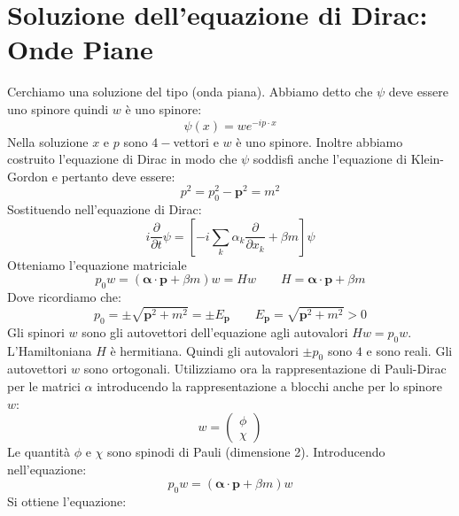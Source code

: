 \section{Soluzione dell'equazione di Dirac: Onde Piane}
Cerchiamo una soluzione del tipo (onda piana). Abbiamo detto che $\psi$ deve essere uno spinore quindi $w$ è uno spinore:
\begin{equation*}
    \psi(x)=we^{-ip\cdot x}
\end{equation*}
Nella soluzione $x$ e $p$ sono $4-$vettori e $w$ è uno spinore. Inoltre abbiamo costruito l'equazione di Dirac in modo che $\psi$ soddisfi anche l'equazione di Klein-Gordon e pertanto deve essere:
\begin{equation*}
    p^2=p^2_0-\mathbf{p}^2=m^2
\end{equation*}
Sostituendo nell'equazione di Dirac:
\begin{equation*}
    i \frac{\partial}{\partial t} \psi=\left[-i \sum_k \alpha_k \frac{\partial}{\partial x_k}+\beta m\right] \psi
\end{equation*}
Otteniamo l'equazione matriciale 
\begin{equation*}
    p_0w=\left(\boldsymbol{\alpha}\cdot\mathbf{p}+\beta m\right)w=Hw \qquad H=\boldsymbol{\alpha}\cdot\mathbf{p}+\beta m
\end{equation*}
Dove ricordiamo che:
\begin{equation*}
    p_0=\pm\sqrt{\mathbf{p}^2+m^2}=\pm E_\mathbf{p} \qquad E_\mathbf{p}=\sqrt{\mathbf{p}^2+m^2}>0
\end{equation*}
Gli spinori $w$ sono gli autovettori dell'equazione agli autovalori $Hw=p_0w$. L'Hamiltoniana $H$ è hermitiana. Quindi gli autovalori $\pm p_0$ sono $4$ e sono reali. Gli autovettori $w$ sono ortogonali. Utilizziamo ora la rappresentazione di Pauli-Dirac per le matrici $\alpha$ introducendo la rappresentazione a blocchi anche per lo spinore $w$:
\begin{equation*}
    w=\begin{pmatrix}
        \phi \\ \chi
    \end{pmatrix}
\end{equation*}
Le quantità $\phi$ e $\chi$ sono spinodi di Pauli (dimensione 2). Introducendo nell'equazione:
\begin{equation*}
    p_0w=\left(\boldsymbol{\alpha}\cdot\mathbf{p}+\beta m\right)w
\end{equation*}
Si ottiene l'equazione:
